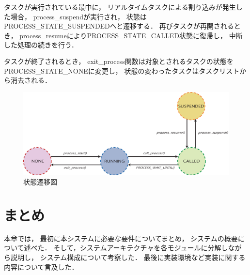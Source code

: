 タスクが実行されている最中に，
リアルタイムタスクによる割り込みが発生した場合，
process\_suspendが実行され，
状態はPROCESS\_STATE\_SUSPENDEDへと遷移する．
再びタスクが再開されるとき，
process\_resumeによりPROCESS\_STATE\_CALLED状態に復帰し，
中断した処理の続きを行う．

タスクが終了されるとき，
exit\_process関数は対象とされるタスクの状態を
PROCESS\_STATE\_NONEに変更し，
状態の変わったタスクはタスクリストから消去される．



\begin{figure}[htbp]
 \begin{center}
  \includegraphics[width=130mm]{./images/state_transition.eps}
 \end{center}
 \caption{状態遷移図}
 \label{fig:state_transition}
\end{figure}




\section{まとめ}
本章では，
最初に本システムに必要な要件についてまとめ，
システムの概要について述べた．
そして，システムアーキテクチャを各モジュールに分解しながら説明し，
システム構成について考察した．
最後に実装環境など実装に関する内容について言及した．



